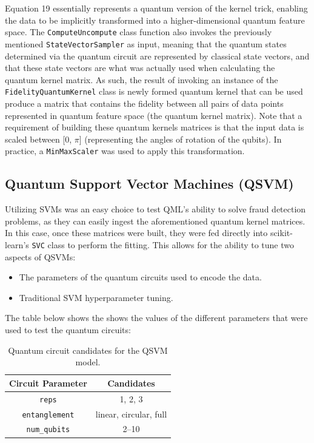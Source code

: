 \documentclass[11pt, oneside]{article}   	%
\begin{document}
Equation 19 essentially represents a quantum version of the kernel trick, enabling the data to be implicitly transformed into a higher-dimensional quantum feature space. The  \texttt{ComputeUncompute} class function also invokes the previously mentioned \texttt{StateVectorSampler} as input, meaning that the quantum states determined via the quantum circuit are represented by classical state vectors, and that these state vectors are what was actually used when calculating the quantum kernel matrix. As such, the result of invoking an instance of the \texttt{FidelityQuantumKernel} class is newly formed quantum kernel that can be used produce a matrix that contains the fidelity between all pairs of data points represented in quantum feature space (the quantum kernel matrix). Note that a requirement of building these quantum kernels matrices is that the input data is scaled between [0, $\pi$] (representing the angles of rotation of the qubits). In practice, a \texttt{MinMaxScaler} was used to apply this transformation.




\subsection{Quantum Support Vector Machines (QSVM)}

Utilizing SVMs was an easy choice to test QML's ability to solve fraud detection problems, as they can easily ingest the aforementioned quantum kernel matrices. In this case, once these matrices were built, they were fed directly into scikit-learn's \texttt{SVC} class to perform the fitting. This allows for the ability to tune two aspects of QSVMs: 

\begin{itemize}
	\item The parameters of the quantum circuits used to encode the data.
	\item Traditional SVM hyperparameter tuning.  
\end{itemize}

The table below shows the shows the values of the different parameters that were used to test the quantum circuits:

\begin{table}[h!]
	\centering
	\begin{tabular}{|c|c|}
		\hline
		\textbf{Circuit Parameter} & \textbf{Candidates} \\ \hline
		\texttt{reps} & 1, 2, 3 \\ \hline
		\texttt{entanglement} & linear, circular, full \\ \hline
		\texttt{num\_qubits} & 2--10 \\ \hline
	\end{tabular}
	\caption{Quantum circuit candidates for the QSVM model.}
	\label{tab3}
\end{table}
\end{document}
